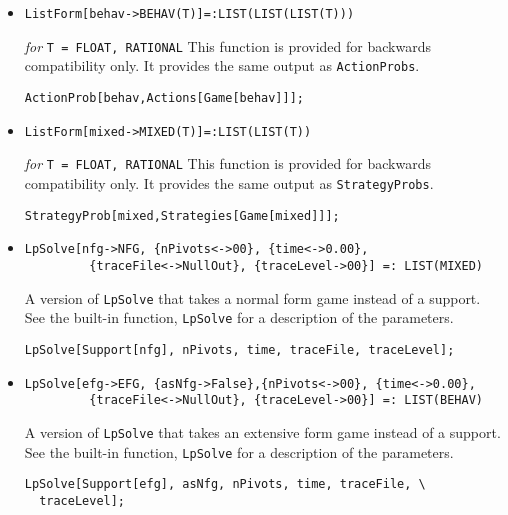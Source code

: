\begin{itemize}
\item{}
\protect \large \begin{verbatim}
ListForm[behav->BEHAV(T)]=:LIST(LIST(LIST(T)))
\end{verbatim}\normalsize

{\it for} {\tt T = FLOAT, RATIONAL}
\bd 
This function is provided for backwards compatibility only.  It
provides the same output as \verb+ActionProbs+.
\begin{verbatim}
ActionProb[behav,Actions[Game[behav]]];
\end{verbatim} 
\ed

\item{}
\protect \large \begin{verbatim}
ListForm[mixed->MIXED(T)]=:LIST(LIST(T))
\end{verbatim}\normalsize

{\it for} {\tt T = FLOAT, RATIONAL}
\bd 
This function is provided for backwards compatibility only.  It
provides the same output as \verb+StrategyProbs+.
\begin{verbatim}
StrategyProb[mixed,Strategies[Game[mixed]]];
\end{verbatim} 
\ed

\item{}
\protect \large \begin{verbatim}
LpSolve[nfg->NFG, {nPivots<->00}, {time<->0.00}, 
         {traceFile<->NullOut}, {traceLevel->00}] =: LIST(MIXED)
\end{verbatim}\normalsize

\bd 
A version of \verb+LpSolve+ that takes a normal form
game instead of a support.  See the built-in function,
\verb+LpSolve+ for a description of the parameters.
\begin{verbatim}
LpSolve[Support[nfg], nPivots, time, traceFile, traceLevel];
\end{verbatim} 
\ed

\item{}
\protect \large \begin{verbatim}
LpSolve[efg->EFG, {asNfg->False},{nPivots<->00}, {time<->0.00}, 
         {traceFile<->NullOut}, {traceLevel->00}] =: LIST(BEHAV)
\end{verbatim}\normalsize

\bd 
A version of \verb+LpSolve+ that takes an extensive form
game instead of a support.  See the built-in function,
\verb+LpSolve+ for a description of the parameters.
\begin{verbatim}
LpSolve[Support[efg], asNfg, nPivots, time, traceFile, \
  traceLevel];
\end{verbatim} 
\ed


\end{itemize}
